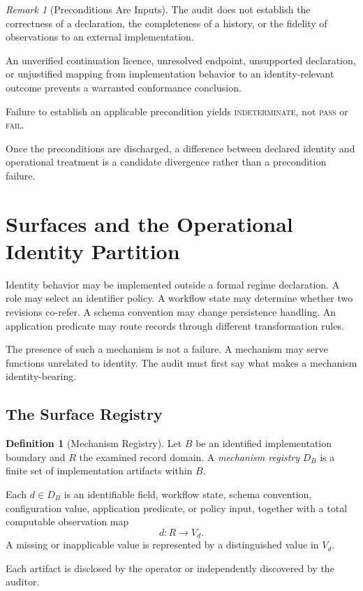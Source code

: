 \documentclass[11pt]{article}
\theoremstyle{plain}
\theoremstyle{definition}
\newtheorem{definition}[theorem]{Definition}
\theoremstyle{remark}
\newtheorem{remark}[theorem]{Remark}
\newcommand{\PASS}{\textnormal{\textsc{pass}}}
\newcommand{\FAIL}{\textnormal{\textsc{fail}}}
\newcommand{\INDET}{\textnormal{\textsc{indeterminate}}}
\begin{document}
\begin{remark}[Preconditions Are Inputs]
  \label{oi.rem.precond}
  The audit does not establish the correctness of a
  declaration, the completeness of a history, or the
  fidelity of observations to an external implementation.

  An unverified continuation licence, unresolved endpoint,
  unsupported declaration, or unjustified mapping from
  implementation behavior to an identity-relevant outcome
  prevents a warranted conformance conclusion.

  Failure to establish an applicable precondition yields
  \INDET{}, not \PASS{} or \FAIL{}.

  Once the preconditions are discharged, a difference
  between declared identity and operational treatment
  is a candidate divergence rather than a precondition failure.
\end{remark}

\section{Surfaces and the Operational Identity Partition}
\label{oi.sec.surface}

Identity behavior may be implemented outside a formal regime declaration.
A role may select an identifier policy.
A workflow state may determine whether two revisions co-refer.
A schema convention may change persistence handling.
An application predicate may route records through different transformation rules.

The presence of such a mechanism is not a failure.
A mechanism may serve functions unrelated to identity.
The audit must first say what makes a mechanism identity-bearing.

\subsection{The Surface Registry}

\begin{definition}[Mechanism Registry]
  \label{oi.def.registry}
  Let \(B\) be an identified implementation boundary
  and \(R\) the examined record domain.
  A \emph{mechanism registry} \(D_B\) is a finite set
  of implementation artifacts within \(B\).

  Each \(d\in D_B\) is an identifiable field,
  workflow state,
  schema convention,
  configuration value,
  application predicate,
  or policy input,
  together with a total computable observation map
  \[
    d:R\longrightarrow V_d.
  \]
  A missing or inapplicable value is represented
  by a distinguished value in \(V_d\).

  Each artifact is disclosed by the operator
  or independently discovered by the auditor.
\end{definition}
\end{document}
